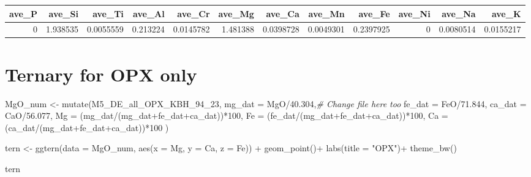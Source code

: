 \documentclass[
]{article}
\newenvironment{Shaded}{\begin{snugshade}}{\end{snugshade}}
\newcommand{\AttributeTok}[1]{\textcolor[rgb]{0.77,0.63,0.00}{#1}}
\newcommand{\CommentTok}[1]{\textcolor[rgb]{0.56,0.35,0.01}{\textit{#1}}}
\newcommand{\DecValTok}[1]{\textcolor[rgb]{0.00,0.00,0.81}{#1}}
\newcommand{\FloatTok}[1]{\textcolor[rgb]{0.00,0.00,0.81}{#1}}
\newcommand{\FunctionTok}[1]{\textcolor[rgb]{0.00,0.00,0.00}{#1}}
\newcommand{\NormalTok}[1]{#1}
\newcommand{\OtherTok}[1]{\textcolor[rgb]{0.56,0.35,0.01}{#1}}
\newcommand{\SpecialCharTok}[1]{\textcolor[rgb]{0.00,0.00,0.00}{#1}}
\newcommand{\StringTok}[1]{\textcolor[rgb]{0.31,0.60,0.02}{#1}}
\begin{document}
\begin{tabular}{r|r|r|r|r|r|r|r|r|r|r|r}
\hline
ave\_P & ave\_Si & ave\_Ti & ave\_Al & ave\_Cr & ave\_Mg & ave\_Ca & ave\_Mn & ave\_Fe & ave\_Ni & ave\_Na & ave\_K\\
\hline
0 & 1.938535 & 0.0055559 & 0.213224 & 0.0145782 & 1.481388 & 0.0398728 & 0.0049301 & 0.2397925 & 0 & 0.0080514 & 0.0155217\\
\hline
\end{tabular}

\hypertarget{ternary-for-opx-only}{%
\section{Ternary for OPX only}\label{ternary-for-opx-only}}

\begin{Shaded}
\begin{Highlighting}[]
\NormalTok{MgO\_num }\OtherTok{\textless{}{-}} \FunctionTok{mutate}\NormalTok{(M5\_DE\_all\_OPX\_KBH\_94\_23, }\AttributeTok{mg\_dat =}\NormalTok{ MgO}\SpecialCharTok{/}\FloatTok{40.304}\NormalTok{,}\CommentTok{\# Change file here too}
                  \AttributeTok{fe\_dat =}\NormalTok{ FeO}\SpecialCharTok{/}\FloatTok{71.844}\NormalTok{,}
                  \AttributeTok{ca\_dat =}\NormalTok{ CaO}\SpecialCharTok{/}\FloatTok{56.077}\NormalTok{,}
                  \AttributeTok{Mg =}\NormalTok{ (mg\_dat}\SpecialCharTok{/}\NormalTok{(mg\_dat}\SpecialCharTok{+}\NormalTok{fe\_dat}\SpecialCharTok{+}\NormalTok{ca\_dat))}\SpecialCharTok{*}\DecValTok{100}\NormalTok{,}
                  \AttributeTok{Fe =}\NormalTok{ (fe\_dat}\SpecialCharTok{/}\NormalTok{(mg\_dat}\SpecialCharTok{+}\NormalTok{fe\_dat}\SpecialCharTok{+}\NormalTok{ca\_dat))}\SpecialCharTok{*}\DecValTok{100}\NormalTok{,}
                  \AttributeTok{Ca =}\NormalTok{ (ca\_dat}\SpecialCharTok{/}\NormalTok{(mg\_dat}\SpecialCharTok{+}\NormalTok{fe\_dat}\SpecialCharTok{+}\NormalTok{ca\_dat))}\SpecialCharTok{*}\DecValTok{100}
\NormalTok{                  ) }

\NormalTok{  tern }\OtherTok{\textless{}{-}} \FunctionTok{ggtern}\NormalTok{(}\AttributeTok{data =}\NormalTok{ MgO\_num, }\FunctionTok{aes}\NormalTok{(}\AttributeTok{x =}\NormalTok{ Mg,}
                          \AttributeTok{y =}\NormalTok{ Ca, }
                          \AttributeTok{z =}\NormalTok{ Fe)) }\SpecialCharTok{+}
  \FunctionTok{geom\_point}\NormalTok{()}\SpecialCharTok{+}
    \FunctionTok{labs}\NormalTok{(}\AttributeTok{title =} \StringTok{"OPX"}\NormalTok{)}\SpecialCharTok{+}
    \FunctionTok{theme\_bw}\NormalTok{()}
  
\NormalTok{  tern}
\end{Highlighting}
\end{Shaded}
\end{document}

